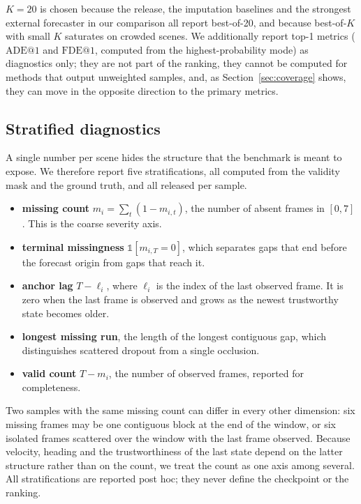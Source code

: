 $K=20$ is chosen because the release, the imputation baselines and the strongest external forecaster in our comparison all report best-of-20, and because best-of-$K$ with small $K$ saturates on crowded scenes. We additionally report top-1 metrics ($\mathrm{ADE@1}$ and $\mathrm{FDE@1}$, computed from the highest-probability mode) as diagnostics only; they are not part of the ranking, they cannot be computed for methods that output unweighted samples, and, as Section~\ref{sec:coverage} shows, they can move in the opposite direction to the primary metrics.

\subsection{Stratified diagnostics}
\label{sec:diagnostics}

A single number per scene hides the structure that the benchmark is meant to expose. We therefore report five stratifications, all computed from the validity mask and the ground truth, and all released per sample.
\begin{itemize}
\item \textbf{missing count} $m_{i}=\sum_{t}(1-m_{i,t})$, the number of absent frames in $[0,7]$. This is the coarse severity axis.
\item \textbf{terminal missingness} $\mathbb{1}[m_{i,T}=0]$, which separates gaps that end before the forecast origin from gaps that reach it.
\item \textbf{anchor lag} $T-\ell_{i}$, where $\ell_{i}$ is the index of the last observed frame. It is zero when the last frame is observed and grows as the newest trustworthy state becomes older.
\item \textbf{longest missing run}, the length of the longest contiguous gap, which distinguishes scattered dropout from a single occlusion.
\item \textbf{valid count} $T-m_{i}$, the number of observed frames, reported for completeness.
\end{itemize}

Two samples with the same missing count can differ in every other dimension: six missing frames may be one contiguous block at the end of the window, or six isolated frames scattered over the window with the last frame observed. Because velocity, heading and the trustworthiness of the last state depend on the latter structure rather than on the count, we treat the count as one axis among several. All stratifications are reported post hoc; they never define the checkpoint or the ranking.

